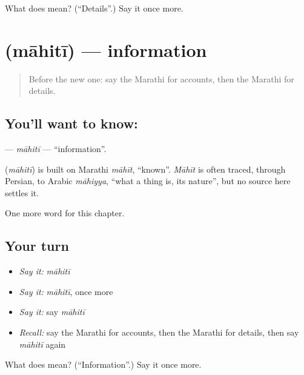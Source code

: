\begin{tcolorbox}[breakable,colback=teal!4,colframe=teal!35!black,title={Before you move on}]
What does  mean? (\textquotedblleft{}Details\textquotedblright{}.) Say it once more.
\end{tcolorbox}
\section[\texorpdfstring{\mr{माहिती} (māhitī)}{माहिती (māhitī)}]{ (māhitī) — information}

\label{lesson:MR-C191-mahiti}



\begin{quote}
Before the new one: say the Marathi for accounts, then the Marathi for details.
\end{quote}

\subsection*{You'll want to know: }
\textbf{} — \emph{māhitī} — \textquotedblleft{}information\textquotedblright{}.

\begin{cousinweb}
\textbf{} (\emph{māhitī}) is built on Marathi \emph{māhīt}, \textquotedblleft{}known\textquotedblright{}. \emph{Māhīt} is often traced, through Persian, to Arabic \emph{māhiyya}, \textquotedblleft{}what a thing is, its nature\textquotedblright{}, but no source here settles it.
\end{cousinweb}

\begin{grammarlens}[title={What you've built}]
One more word for this chapter.
\end{grammarlens}

\subsection*{Your turn}
\begin{itemize}
\raggedright
  \item \emph{Say it:} \emph{māhitī}
  \item \emph{Say it:} \emph{māhitī}, once more
  \item \emph{Say it:} say \emph{māhitī}
  \item \emph{Recall:} say the Marathi for accounts, then the Marathi for details, then say \emph{māhitī} again
\end{itemize}

\begin{tcolorbox}[breakable,colback=teal!4,colframe=teal!35!black,title={Before you move on}]
What does  mean? (\textquotedblleft{}Information\textquotedblright{}.) Say it once more.
\end{tcolorbox}
